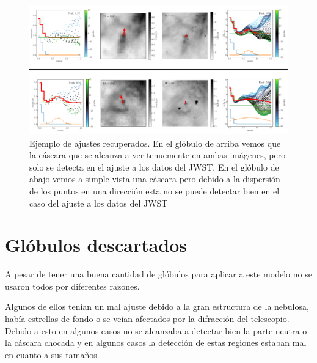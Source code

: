 \documentclass{book}
\begin{document}
\begin{figure}[htb]
    \centering
    \includegraphics[width=\textwidth]{Nuevas imagenes finales/C4_Recuperados_ajustes.pdf}
    \caption{Ejemplo de ajustes recuperados. En el glóbulo de arriba vemos que la cáscara que se alcanza a ver tenuemente en ambas imágenes, pero solo se detecta en el ajuste a los datos del JWST. En el glóbulo de abajo vemos a simple vista una cáscara pero debido a la dispersión de los puntos en una dirección esta no se puede detectar bien en el caso del ajuste a los datos del JWST}
    \label{Recuperados Globulos}
\end{figure}

\section{Glóbulos descartados}\label{Bad globules}

A pesar de tener una buena cantidad de glóbulos para aplicar a este modelo no se usaron todos por diferentes razones. 

Algunos de ellos tenían un mal ajuste debido a la gran estructura de la nebulosa, había estrellas de fondo o se veían afectados por la difracción del telescopio.  Debido a esto en algunos casos no se alcanzaba a detectar bien la parte neutra o la cáscara chocada y en algunos casos la detección de estas regiones estaban mal en cuanto a sus tamaños.  
\end{document}
